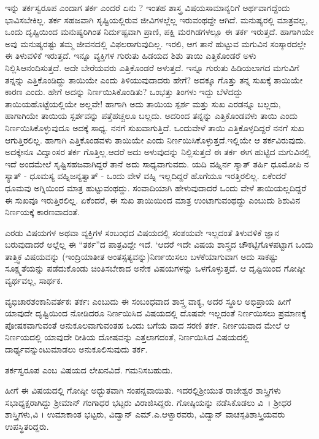 {ಇನ್ನು ತರ್ಕ\enginline{-}ಸ್ವರೂಪ ಎಂದಾಗ ತರ್ಕ ಎಂದರೆ ಏನು ? ಇಂತಹ ಶಾಸ್ತ್ರ ವಿಷಯ\break ಸಾಮಾನ್ಯರಿಗೆ ಅರ್ಥವಾಗದ್ದೆಂದು ಭಾವಿಸಬೇಕಿಲ್ಲ. ತರ್ಕ ಸಹಜವಾಗಿ ಸೃಷ್ಟಿಯಲ್ಲಿರುವ ಜೀವಿಗಳಲ್ಲೆಲ್ಲ ಇರುವಂಥದ್ದೇ ಆಗಿದೆ. ಮನುಷ್ಯರಲ್ಲಿ ಮಾತ್ರವಲ್ಲ, ಒಂದು ದೃಷ್ಟಿಯಿಂದ ಮನುಷ್ಯರಿ\-ಗಿಂತ ನಿರ್ದುಷ್ಟವಾಗಿ ಪ್ರಾಣಿ, ಪಕ್ಷಿ ಮರಗಿಡಗಳಲ್ಲೂ ಈ ತರ್ಕ ಇರುತ್ತದೆ. ಹಾಗಾಗಿಯೇ ಅವು ಮನುಷ್ಯರಷ್ಟು ತಮ್ಮ ಜೀವನದಲ್ಲಿ ವಿಫಲರಾಗುವುದಿಲ್ಲ. ಇರಲಿ, ಆಗ ತಾನೆ ಹುಟ್ಟುವ ಮಗುವಿನ ಸಂಸ್ಕಾರದಲ್ಲೇ ಈ ತಿಳುವಳಿಕೆ ಇರುತ್ತದೆ. ಇನ್ನೂ ವ್ಯಕ್ತಿಗಳ ಗುರುತು ಹಿಡಯದ ಶಿಶು ತಾಯಿ ಎತ್ತಿಕೊಂಡರೆ ಅಳು ನಿಲ್ಲಿಸಿ\break ಆನಂದಿಸುತ್ತದೆ. ಅದೇ ಬೇರೆಯವರು ಎತ್ತಿಕೊಂಡರೆ ಅಳುತ್ತದೆ. ಇನ್ನೂ ಗುರುತು ಹಿಡಿಯ\-ಲಾಗದ ಮಗು\-ವಿಗೆ ತನ್ನನ್ನು ಎತ್ತಿಕೊಂಡಿದ್ದು ತಾಯಿಯೇ ಎಂದು ತಿಳಿಯುವುದಾದರು ಹೇಗೆ? ಅದಕ್ಕೂ ಗೊತ್ತು ತನ್ನ ಸುಖಕ್ಕೆ ತಾಯಿಯೇ ಕಾರಣ ಎಂದು. ಹೇಗೆ ಅದನ್ನು ನಿರ್ಣಯಿಸಿ\-ಕೊಂಡಿತು? ಒಂಭತ್ತು ತಿಂಗಳು ಇದ್ದು ಬೆಳೆದದ್ದು ತಾಯಿಯ\break ಹೊಟ್ಟೆಯಲ್ಲಿಯೇ ಅಲ್ಲವೇ! ಹಾಗಾಗಿ ಅದು ತಾಯಿಯ ಸ್ಪರ್ಶ ಮತ್ತು ಸುಖ ಎರಡನ್ನೂ ಬಲ್ಲದು, ಹಾಗಾಗಿಯೇ ತಾಯಿಯ ಸ್ಪರ್ಶವನ್ನು ಪತ್ತೆಹಚ್ಚಲೂ ಬಲ್ಲದು. ಅದರಿಂದ ತನ್ನನ್ನು ಎತ್ತಿಕೊಂಡವಳು ತಾಯಿ ಎಂದು ನಿರ್ಣಯಿಸಿಕೊಳ್ಳುವುದೂ ಅದಕ್ಕೆ ಸಾಧ್ಯ. ನನಗೆ ಸುಖವಾಗುತ್ತಿದೆ. ಒಂದುವೇಳೆ ತಾಯಿ ಎತ್ತಿಕೊಳ್ಳದಿದ್ದರೆ ನನಗೆ ಸುಖ ಆಗುತ್ತಿರಲಿಲ್ಲ. ಹಾಗಾಗಿ ಎತ್ತಿಕೊಂಡವಳು ತಾಯಿಯೇ ಎಂದು ನಿರ್ಣಯಿಸಿಕೊಳ್ಳುತ್ತದೆ.\break ಇಲ್ಲಿಯೇ ಆ ತರ್ಕವಿರುವುದು. ಅದಕ್ಕೇನೂ ವಿದ್ವಾಂಸರ ತರ್ಕ ಗೊತ್ತಿಲ್ಲ.ಆದರೆ ಅದು ಅಳುವುದನ್ನು ನಿಲ್ಲಿಸುತ್ತದೆ ಈ ತರ್ಕ ಈಗ ಹುಟ್ಟಿದ ಮಗುವಿನಲ್ಲಿ  ಇದೆ  ಅಂದಮೇಲೆ ಸೃಷ್ಟಿಸಹಜವಾಗಿದ್ದರೆ ತಾನೆ ಅದು ಸಾಧ್ಯವಾಗುವದು. 
ಯದಿ ವಹ್ನಿರ್ನ ಸ್ಯಾತ್ ತರ್ಹಿ ಧೂಮೋಪಿ ನ ಸ್ಯಾತ್ - ಧೂಮಸ್ಯ ವಹ್ನಿಜನ್ಯತ್ವಾತ್ - ಒಂದು ವೇಳೆ ವಹ್ನಿ ಇಲ್ಲದಿದ್ದರೆ ಹೊಗೆಯೂ ಇರತ್ತಿರಲಿಲ್ಲ. ಏಕೆಂದರೆ ಧೂಮವು ಅಗ್ನಿಯಿಂದ ಮಾತ್ರ \hbox{ಹುಟ್ಟುವಂಥದ್ದು.} ಸಂವಾದಿಯಾಗಿ ಹೇಳುವುದಾದರೆ ಒಂದು ವೇಳೆ ತಾಯಿಯಲ್ಲದಿದ್ದರೆ ಈ ಸುಖವೂ ಇರುತ್ತಿರಲಿಲ್ಲ. ಏಕೆಂದರೆ, ಈ ಸುಖ ತಾಯಿಯಿಂದ ಮಾತ್ರ  ಉಂಟಾಗುವಂಥದ್ದು   ಎಂಬುದು ಶಿಶುವಿನ  ನಿರ್ಣಯಕ್ಕೆ ಕಾರಣವಾದಂತೆ. 

ಎರಡು ವಿಷಯಗಳ ಅಥವಾ ವ್ಯಕ್ತಿಗಳ ಸಂಬಂಧದ ವಿಷಯದಲ್ಲಿ ಸಂಶಯವೇ ಇಲ್ಲದಂತೆ ತಿಳುವಳಿಕೆ \enginline{-} ಜ್ಞಾನ ಬರುವುದಾದರೆ ಅಲ್ಲೆಲ್ಲ ಈ “ತರ್ಕ”ದ \hbox{ಪಾತ್ರವಿದ್ದೇ} ಇದೆ. ‘ಆದರೆ ಇದೇ ವಿಷಯ ಶಾಸ್ತ್ರದ ಚೌಕಟ್ಟಿಗೊಳಪಟ್ಟಾಗ ಒಂದು ತಾತ್ತ್ವಿಕ ವಿಷಯವನ್ನು (ಇಂದ್ರಿಯಾತೀತ ಅಂತಸ್ಸತ್ಯವನ್ನು)ನಿರ್ಣಯಿಸಲು ಬಳಕೆಯಾಗುವಾಗ ಅದು ಸಾಕಷ್ಟು ಸೂಕ್ಷ್ಮತೆಯನ್ನು ಪಡೆದುಕೊಂಡು  ಚಿಂತಿಸಬೇಕಾದ ಅನೇಕ ವಿಷಯಗಳನ್ನು ಒಳಗೊಳ್ಳುತ್ತದೆ. ಆ ದೃಷ್ಟಿಯಿಂದ ಗೋಷ್ಠೀ ವ್ಯರ್ಥವಲ್ಲ, ಸಾರ್ಥಕ. 

ವ್ಯಭಿಚಾರಶಂಕಾನಿವರ್ತಕಃ ತರ್ಕಃ ಎಂಬುದು ಈ ಸಂಬಂಧವಾದ ಶಾಸ್ತ್ರ ವಾಕ್ಯ, ಅದರ ಸ್ಥೂಲ ಅಭಿಪ್ರಾಯ ಹೀಗೆ \enginline{-} ಯಾವುದೇ ದೃಷ್ಟಿಯಿಂದ ನೋಡಿದರೂ ನಿರ್ಣಯಿ\-ಸಿದ ವಿಷಯದಲ್ಲಿ ದೊಷವೇ ಇಲ್ಲದಂತೆ ನಿರ್ಣಯಿಸಲು ಪ್ರಮಾಣಕ್ಕೆ ಪೋಷಕವಾಗುವಂತೆ ಅನುಕೂಲವಾಗುವಂತಹ ಒಂದು ಬಗೆಯ ವಾದ ಸರಣಿ \enginline{-} ತರ್ಕ. ನಿರ್ಣಯವಾದ ಮೇಲೆ ಆ ನಿರ್ಣಯದಲ್ಲಿ ಯಾವುದೇ ರೀತಿಯ ದೋಷವನ್ನು ಎತ್ತಲಾಗದಂತೆ, ನಿರ್ಣಯಿಸಿದ ವಿಷಯದಲ್ಲಿ ದಾರ್ಢ್ಯವನ್ನುಂಟುಮಾಡಲು ಅನುಕೂಲಿಸುವುದು ತರ್ಕ.

ತರ್ಕಸ್ವರೂಪ ಎಂಬ ವಿಷಯದ ಲೇಖನವಿದೆ. ಗಮನಿಸಬಹುದು.

ಹೀಗೆ ಈ ವಿಷಯದಲ್ಲಿ ಗೋಷ್ಠೀ ಅಧ್ಭುತವಾಗಿ ಸಂಪನ್ನವಾಯಿತು. ಇದರಲ್ಲಿ\break ಶ್ರೀಯುತ ರಾಜೇಶ್ವರ ಶಾಸ್ತ್ರಿಗಳು ಸಭಾಧ್ಯಕ್ಷರಾಗಿದ್ದು ಶ್ರೀಮಾನ್ ಗಂಗಾಧರ ಭಟ್ಟರು ವಿರಾಜಿಸಿದ್ದರು. ಗೋಷ್ಠಿಯನ್ನು ನಡೆಸಿಕೊಡಲು ವಿ~। ಶ್ರೀಧರ ಶಾಸ್ತ್ರಿಗಳು,\break ವಿ । ಉಮಾಕಾಂತ ಭಟ್ಟರು, ವಿದ್ವಾನ್ ಎಮ್.ಎ.ಆಳ್ವಾರವರು, ವಿದ್ವಾನ್ ವಾಚಸ್ಪತಿ\break ಶಾಸ್ತ್ರಿಯವರು ಉಪಸ್ಥಿತರಿದ್ದರು. 

}
